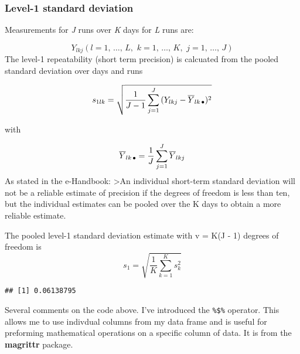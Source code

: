\documentclass[]{book}
\newenvironment{Shaded}{\begin{snugshade}}{\end{snugshade}}
\newcommand{\DataTypeTok}[1]{\textcolor[rgb]{0.13,0.29,0.53}{#1}}
\newcommand{\DecValTok}[1]{\textcolor[rgb]{0.00,0.00,0.81}{#1}}
\newcommand{\KeywordTok}[1]{\textcolor[rgb]{0.13,0.29,0.53}{\textbf{#1}}}
\newcommand{\NormalTok}[1]{#1}
\newcommand{\OperatorTok}[1]{\textcolor[rgb]{0.81,0.36,0.00}{\textbf{#1}}}
\newcommand{\StringTok}[1]{\textcolor[rgb]{0.31,0.60,0.02}{#1}}
\theoremstyle{definition}
\theoremstyle{definition}
\theoremstyle{definition}
\theoremstyle{remark}
\begin{document}
\hypertarget{level-1-standard-deviation}{%
\subsubsection{Level-1 standard
deviation}\label{level-1-standard-deviation}}

Measurements for \emph{J} runs over \emph{K} days for \emph{L} runs are:

\[
Y_{lkj}(l = 1, \, \ldots, \, L, \,\, k=1, \,\ldots, \, K, \,\, j=1, \,\ldots, \, J)
\] The level-1 repeatability (short term precision) is calcuated from
the pooled standard deviation over days and runs

\[
s_{1lk} = \sqrt{\frac{1}{J-1} \sum_{j=1}^{J}{(Y_{lkj} - \overline{Y}_{lk{\small \, \bullet}})^2}}
\]

with

\[
\overline{Y}_{lk{\small \, \bullet}} = \frac{1}{J}\sum_{j=1}^{J}{\overline{Y}_{lkj}}
\] As stated in the e-Handbook: \textgreater{}An individual short-term
standard deviation will not be a reliable estimate of precision if the
degrees of freedom is less than ten, but the individual estimates can be
pooled over the K days to obtain a more reliable estimate.

The pooled level-1 standard deviation estimate with v = K(J - 1) degrees
of freedom is \[
s_1 = \sqrt{\frac{1}{K} \sum_{k=1}^{K} s_k^2}
\]

\begin{Shaded}
\end{Shaded}

\begin{verbatim}
## [1] 0.06138795
\end{verbatim}

Several comments on the code above. I've introduced the \texttt{\%\$\%}
operator. This allows me to use indivdual columns from my data frame and
is useful for preforming mathematical operations on a specific column of
data. It is from the \textbf{magrittr} package.
\end{document}
